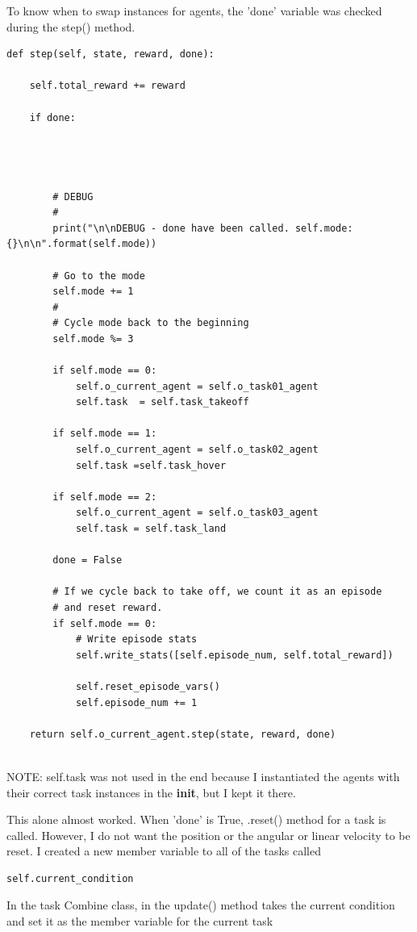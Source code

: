 \documentclass[11pt]{article}
\begin{document}
To know when to swap instances for agents, the 'done' variable was
checked during the step() method.

\begin{verbatim}
def step(self, state, reward, done):

    self.total_reward += reward

    if done:




        # DEBUG
        #
        print("\n\nDEBUG - done have been called. self.mode: {}\n\n".format(self.mode))
        
        # Go to the mode
        self.mode += 1
        #
        # Cycle mode back to the beginning
        self.mode %= 3

        if self.mode == 0:
            self.o_current_agent = self.o_task01_agent
            self.task  = self.task_takeoff

        if self.mode == 1:
            self.o_current_agent = self.o_task02_agent
            self.task =self.task_hover

        if self.mode == 2:
            self.o_current_agent = self.o_task03_agent
            self.task = self.task_land

        done = False

        # If we cycle back to take off, we count it as an episode
        # and reset reward.
        if self.mode == 0:
            # Write episode stats
            self.write_stats([self.episode_num, self.total_reward])

            self.reset_episode_vars()
            self.episode_num += 1

    return self.o_current_agent.step(state, reward, done)
    
\end{verbatim}

NOTE: self.task was not used in the end because I instantiated the
agents with their correct task instances in the \textbf{init}, but I
kept it there.

This alone almost worked. When 'done' is True, .reset() method for a
task is called. However, I do not want the position or the angular or
linear velocity to be reset. I created a new member variable to all of
the tasks called

\begin{verbatim}
self.current_condition
\end{verbatim}

In the task Combine class, in the update() method takes the current
condition and set it as the member variable for the current task
\end{document}
